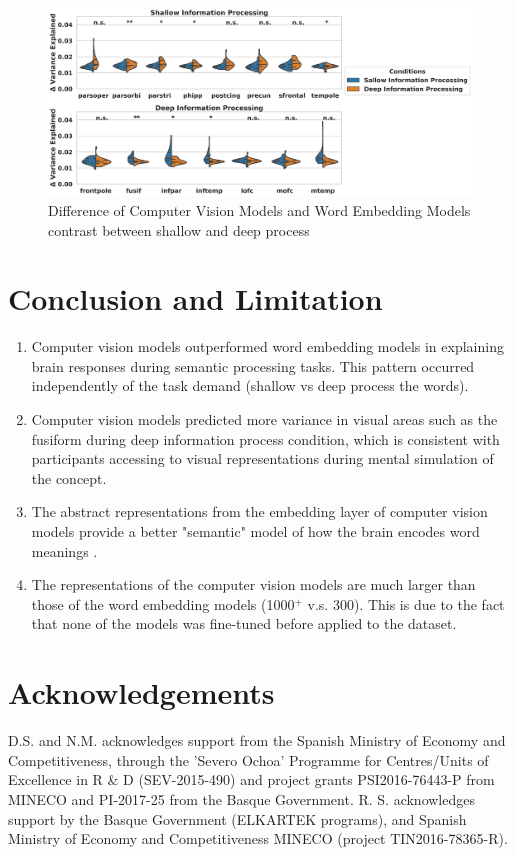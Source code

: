 \documentclass{sciposter}
\begin{document}
\begin{multicols}{3}
\begin{figure}
    \centering
    \includegraphics[width=1.\linewidth]{fig7.png}
    \caption{Difference of Computer Vision Models and Word Embedding Models contrast between shallow and deep process}
    \label{fig5}
\end{figure}

\section{Conclusion and Limitation}

\begin{enumerate}
    \large
    \item Computer vision models outperformed word embedding models in explaining brain responses during semantic processing tasks. This pattern occurred independently of the task demand (shallow vs deep process the words). 
    \item Computer vision models predicted more variance in visual areas such as the fusiform during deep information process condition, which is consistent with participants accessing to visual representations during mental simulation of the concept. 
    \item The abstract representations from the embedding layer of computer vision models provide a better "semantic" model of how the brain encodes word meanings \cite{vogel2007semantic}.
    \item The representations of the computer vision models are much larger than those of the word embedding models (1000$^+$ v.s. 300). This is due to the fact that none of the models was fine-tuned before applied to the dataset.
\end{enumerate}



{\tiny }
  
\section{Acknowledgements}
\tiny
D.S. and N.M. acknowledges support from the Spanish Ministry of Economy and Competitiveness, through the 'Severo Ochoa' Programme for Centres/Units of Excellence in R \& D (SEV-2015-490) and project grants PSI2016-76443-P from MINECO and PI-2017-25 from the Basque Government. R. S. acknowledges support by the Basque Government (ELKARTEK programs), and Spanish Ministry of Economy and Competitiveness MINECO (project TIN2016-78365-R).

\end{multicols}
\end{document}
